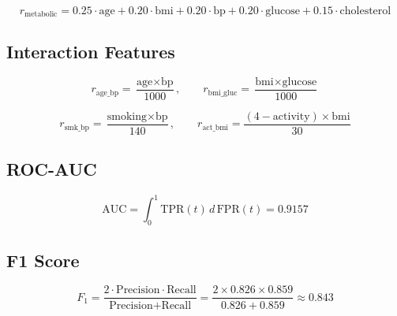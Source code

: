 \documentclass[12pt,a4paper]{report}
\begin{document}
\[
r_{\text{metabolic}} = 0.25 \cdot \text{age} + 0.20 \cdot \text{bmi} + 0.20 \cdot \text{bp} + 0.20 \cdot \text{glucose} + 0.15 \cdot \text{cholesterol}
\]

\subsection*{Interaction Features}

\[
r_{\text{age\_bp}} = \frac{\text{age} \times \text{bp}}{1000}, \qquad
r_{\text{bmi\_gluc}} = \frac{\text{bmi} \times \text{glucose}}{1000}
\]

\[
r_{\text{smk\_bp}} = \frac{\text{smoking} \times \text{bp}}{140}, \qquad
r_{\text{act\_bmi}} = \frac{(4 - \text{activity}) \times \text{bmi}}{30}
\]

\subsection*{ROC-AUC}

\[
\text{AUC} = \int_0^1 \text{TPR}(t)\, d\,\text{FPR}(t) = 0.9157
\]

\subsection*{F1 Score}

\[
F_1 = \frac{2 \cdot \text{Precision} \cdot \text{Recall}}{\text{Precision} + \text{Recall}} = \frac{2 \times 0.826 \times 0.859}{0.826 + 0.859} \approx 0.843
\]
\end{document}

